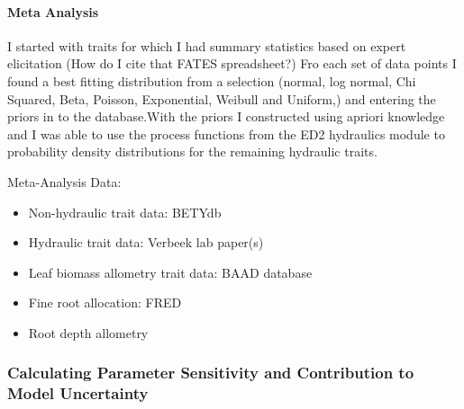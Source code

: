 
\paragraph{Meta Analysis}

I started with traits for which I had summary statistics based on expert elicitation (How do I cite that FATES spreadsheet?) Fro each set of data points I found a best fitting distribution from a selection (normal, log normal, Chi Squared, Beta, Poisson, Exponential, Weibull and Uniform,) and entering the priors in to the database.With the priors I constructed using apriori knowledge and I was able to use the process functions from the ED2 hydraulics module to probability density distributions for the remaining hydraulic traits. 



Meta-Analysis Data:
\begin{itemize}
    \item Non-hydraulic trait data: BETYdb \citep{lebauer_2017}
    \item Hydraulic trait data: Verbeek lab paper(s) 
    \item Leaf biomass allometry trait data: BAAD database \citep{falster_2015}
    \item Fine root allocation: FRED \citep{iversen_2017}
    \item Root depth allometry \citep{smithmartin_2020}
\end{itemize}




\subsubsection*{Calculating Parameter Sensitivity and Contribution to Model Uncertainty}

